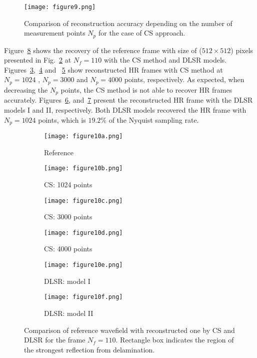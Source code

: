 \begin{figure} [!ht]
	\centering
	\texttt{[image: figure9.png]}
	\caption{Comparison of reconstruction accuracy depending on the number of measurement points $N_p$ for the case of CS approach.}
	\label{fig:points_metrics}
\end{figure}

Figure~\ref{fig:frame110_comparison} shows the recovery of the reference frame with size of (\(512\times512\)) pixels presented in Fig.~\ref{fig:frame110_ref} at $N_f=110$ with the CS method and DLSR models.
Figures~\ref{fig:frame110_CS1024},~\ref{fig:frame110_CS3000} and ~\ref{fig:frame110_CS4000} show reconstructed HR frames with CS method at $N_p=1024$ , $N_p=3000$ and $N_p=4000$ points, respectively.
As expected, when decreasing the $N_p$ points, the CS method is not able to recover HR frames accurately.
Figures~\ref{fig:frame110_Abdalraheem}, and~\ref{fig:frame110_Saeed} present the reconstructed HR frame with the DLSR models I and II, respectively.
Both DLSR models recovered the HR frame with $N_p=1024$ points, which is \(19.2\%\) of the Nyquist sampling rate.

\begin{figure} [!ht]
	\centering
	\begin{subfigure}[b]{0.32\textwidth}
		\centering
		\texttt{[image: figure10a.png]}
		\caption{Reference}
		\label{fig:frame110_ref}
	\end{subfigure}
	\hfill
	\begin{subfigure}[b]{0.32\textwidth}
		\centering
		\texttt{[image: figure10b.png]}
		\caption{CS: 1024 points}
		\label{fig:frame110_CS1024}
	\end{subfigure}
	\hfill
	\begin{subfigure}[b]{0.32\textwidth}
		\centering
		\texttt{[image: figure10c.png]}
		\caption{CS: 3000 points}
		\label{fig:frame110_CS3000}
	\end{subfigure}	
	\hfill
	\begin{subfigure}[b]{0.32\textwidth}
		\centering
		\texttt{[image: figure10d.png]}
		\caption{CS: 4000 points}
		\label{fig:frame110_CS4000}
	\end{subfigure}
	\hfill
	\begin{subfigure}[b]{0.32\textwidth}
		\centering
		\texttt{[image: figure10e.png]}
		\caption{DLSR: model I}
		\label{fig:frame110_Abdalraheem}
	\end{subfigure}
	\hfill
	\begin{subfigure}[b]{0.32\textwidth}
		\centering
		\texttt{[image: figure10f.png]}
		\caption{DLSR: model II}
		\label{fig:frame110_Saeed}
	\end{subfigure}
	
	\caption{Comparison of reference wavefield with reconstructed one by CS and DLSR for the frame $N_f = 110$. Rectangle box indicates the region of the strongest reflection from delamination.}
	\label{fig:frame110_comparison}
\end{figure} 

